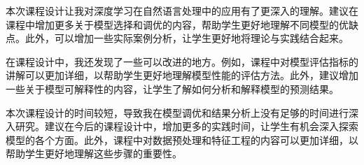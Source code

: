 本次课程设计让我对深度学习在自然语言处理中的应用有了更深入的理解。建议在课程中增加更多关于模型选择和调优的内容，帮助学生更好地理解不同模型的优缺点。此外，可以增加一些实际案例分析，让学生更好地将理论与实践结合起来。

在课程设计中，我还发现了一些可以改进的地方。例如，课程中对模型评估指标的讲解可以更加详细，以帮助学生更好地理解模型性能的评估方法。此外，建议增加一些关于模型可解释性的内容，让学生了解如何分析和解释模型的预测结果。

本次课程设计的时间较短，导致我在模型调优和结果分析上没有足够的时间进行深入研究。建议在今后的课程设计中，增加更多的实践时间，让学生有机会深入探索模型的各个方面。此外，课程中对数据预处理和特征工程的内容可以更加详细，以帮助学生更好地理解这些步骤的重要性。